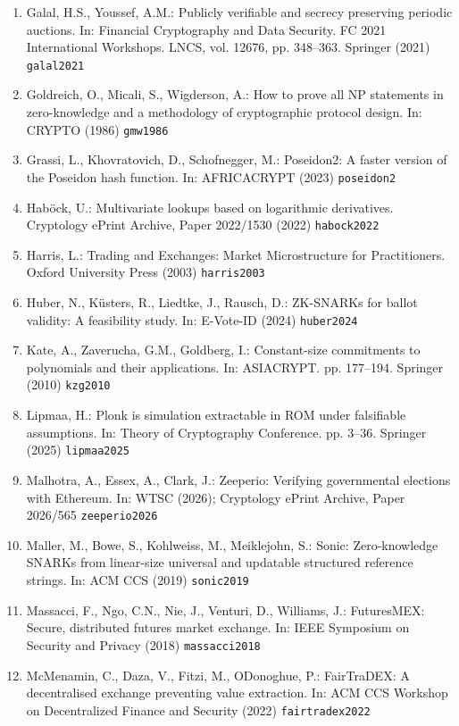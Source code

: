 \begin{enumerate}
\item
  Galal, H.S., Youssef, A.M.: Publicly verifiable and secrecy preserving periodic auctions. In: Financial Cryptography and Data Security. FC 2021 International Workshops. LNCS, vol. 12676, pp. 348--363. Springer (2021) \texttt{galal2021}
\item
  Goldreich, O., Micali, S., Wigderson, A.: How to prove all NP statements in zero-knowledge and a methodology of cryptographic protocol design. In: CRYPTO (1986) \texttt{gmw1986}
\item
  Grassi, L., Khovratovich, D., Schofnegger, M.: Poseidon2: A faster version of the Poseidon hash function. In: AFRICACRYPT (2023) \texttt{poseidon2}
\item
  Haböck, U.: Multivariate lookups based on logarithmic derivatives. Cryptology ePrint Archive, Paper 2022/1530 (2022) \texttt{habock2022}
\item
  Harris, L.: Trading and Exchanges: Market Microstructure for Practitioners. Oxford University Press (2003) \texttt{harris2003}
\item
  Huber, N., Küsters, R., Liedtke, J., Rausch, D.: ZK-SNARKs for ballot validity: A feasibility study. In: E-Vote-ID (2024) \texttt{huber2024}
\item
  Kate, A., Zaverucha, G.M., Goldberg, I.: Constant-size commitments to polynomials and their applications. In: ASIACRYPT. pp. 177--194. Springer (2010) \texttt{kzg2010}
\item
  Lipmaa, H.: Plonk is simulation extractable in ROM under falsifiable assumptions. In: Theory of Cryptography Conference. pp. 3--36. Springer (2025) \texttt{lipmaa2025}
\item
  Malhotra, A., Essex, A., Clark, J.: Zeeperio: Verifying governmental elections with Ethereum. In: WTSC (2026); Cryptology ePrint Archive, Paper 2026/565 \texttt{zeeperio2026}
\item
  Maller, M., Bowe, S., Kohlweiss, M., Meiklejohn, S.: Sonic: Zero-knowledge SNARKs from linear-size universal and updatable structured reference strings. In: ACM CCS (2019) \texttt{sonic2019}
\item
  Massacci, F., Ngo, C.N., Nie, J., Venturi, D., Williams, J.: FuturesMEX: Secure, distributed futures market exchange. In: IEEE Symposium on Security and Privacy (2018) \texttt{massacci2018}
\item
  McMenamin, C., Daza, V., Fitzi, M., O\textquotesingle Donoghue, P.: FairTraDEX: A decentralised exchange preventing value extraction. In: ACM CCS Workshop on Decentralized Finance and Security (2022) \texttt{fairtradex2022}

\end{enumerate}

